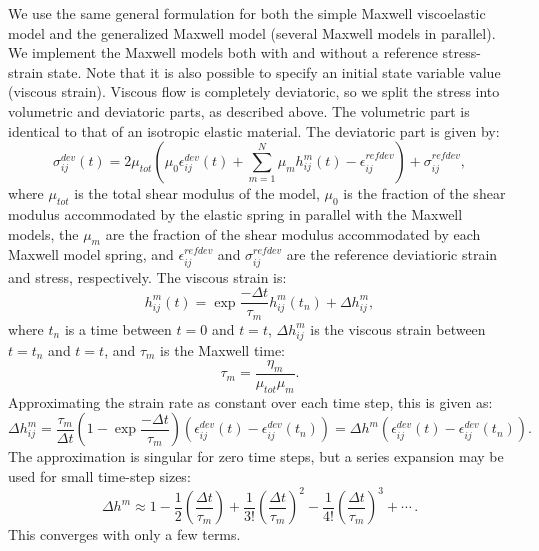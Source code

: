 We use the same general formulation for both the simple Maxwell
viscoelastic model and the generalized Maxwell model (several Maxwell
models in parallel). We implement the Maxwell models both with and
without a reference stress-strain state. Note that it is also possible
to specify an initial state variable value (viscous strain). Viscous
flow is completely deviatoric, so we split the stress into volumetric
and deviatoric parts, as described above.  The volumetric part is
identical to that of an isotropic elastic material. The deviatoric
part is given by:
\begin{equation}
  \sigma^\mathit{dev}_{ij}\left(t\right)=2\mu_{tot}\left(\mu_{0}\epsilon^\mathit{dev}_{ij}
    \left(t\right)+\sum_{m=1}^{N}\mu_{m}h^{m}_{ij}\left(t\right)-\epsilon^\mathit{refdev}_{ij}
    \right)+\sigma^\mathit{refdev}_{ij},
\end{equation}
where $\mu_{tot}$ is the total shear modulus of the model, $\mu_{0}$
is the fraction of the shear modulus accommodated by the elastic
spring in parallel with the Maxwell models, the $\mu_{m}$ are the
fraction of the shear modulus accommodated by each Maxwell model
spring, and $\epsilon^{\mathit{refdev}}_{ij}$ and
$\sigma^{\mathit{refdev}}_{ij}$ are the reference deviatioric strain
and stress, respectively. The viscous strain is:
\begin{equation}
h^{m}_{ij}\left(t\right)=\exp\frac{-\Delta
  t}{\tau_{m}}h^{m}_{ij}\left(t_{n}\right)+\Delta h^{m}_{ij},
\end{equation}
where $t_{n}$ is a time between $t=0$ and $t=t$, $\Delta
h^{m}_{ij}$ is the viscous strain between $t=t_{n}$ and
$t=t$, and $\tau_{m}$ is the Maxwell time:
\begin{equation}
  \tau_{m}=\frac{\eta_{m}}{\mu_{tot}\mu_{m}}.
\end{equation}
Approximating the strain rate as constant over each time step,
this is given as:
\begin{equation}
\Delta h^{m}_{ij}=\frac{\tau_{m}}{\Delta t}\left(1-\exp\frac{-\Delta
  t}{\tau_{m}}\right)\left(\epsilon^{\mathit{dev}}_{ij}\left(t\right)-\epsilon^{\mathit{dev}}_{ij}\left(t_{n}\right)\right)=\Delta
h^{m}\left(\epsilon^{\mathit{dev}}_{ij}\left(t\right)-\epsilon^{\mathit{dev}}_{ij}\left(t_n\right)\right).
\end{equation}
The approximation is singular for zero time steps, but a series
expansion may be used for small time-step sizes:
\begin{equation}
  \Delta h^{m}\approx1-\frac{1}{2}\left(\frac{\Delta
    t}{\tau_{m}}\right)+\frac{1}{3!}\left(\frac{\Delta
    t}{\tau_{m}}\right)^{2}-\frac{1}{4!}\left(\frac{\Delta
    t}{\tau_{m}}\right)^{3}+\cdots\,.
\end{equation}
This converges with only a few terms.
